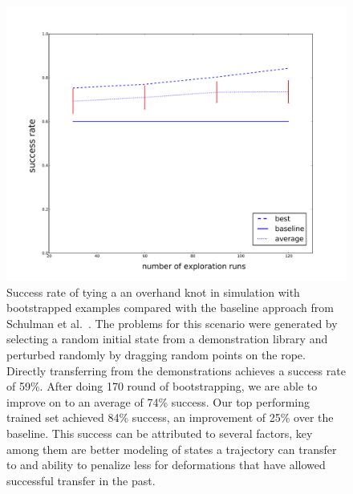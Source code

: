 \begin{figure}
  \includegraphics[width=\linewidth]{figs/results.pdf}
  \caption{Success rate of tying a an overhand knot in simulation with bootstrapped 
          examples compared with the baseline approach from Schulman et 
          al.~\cite{Schulmanetal_ISRR2013}. The problems for this scenario were generated
          by selecting a random initial state from a demonstration library and perturbed
          randomly by dragging random points on the rope. Directly transferring from the
          demonstrations achieves a success rate of 59\%. After doing 170 round of bootstrapping,
          we are able to improve on to an average of 74\% success. Our top performing trained set
          achieved 84\% success, an improvement of 25\% over the baseline. This success can
          be attributed to several factors, key among them are better modeling of states
          a trajectory can transfer to and ability to penalize less for deformations that 
          have allowed successful transfer in the past.}
  \label{fig:results}
\end{figure}

